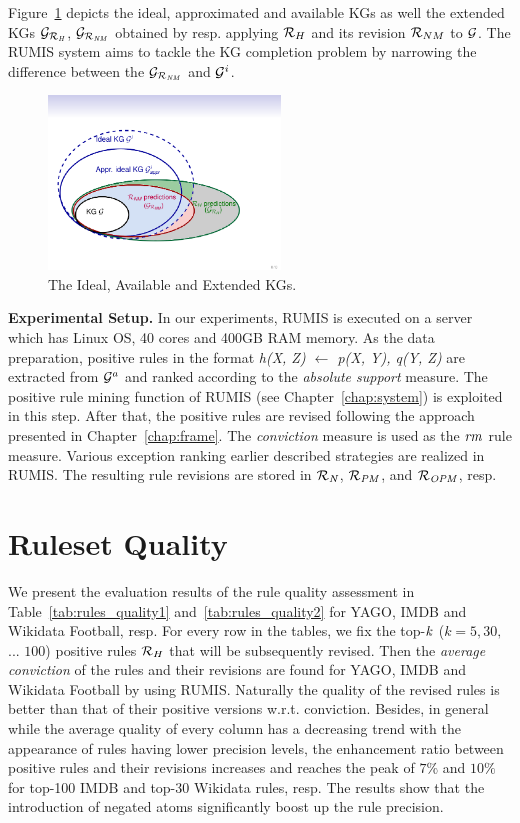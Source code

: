 Figure~\ref{fig:venn} depicts the ideal, approximated and available KGs as well the extended KGs $\mathcal{G}_{\mathcal{R}_{\mathit{H}}}$, $\mathcal{G}_{\mathcal{R}_{\mathit{NM}}}$ obtained by resp. applying $\mathcal{R}_H$ and its revision $\mathcal{R}_{NM}$ to $\mathcal{G}$. The RUMIS system aims to tackle the KG completion problem by narrowing the difference between the $\mathcal{G}_{\mathcal{R}_{\mathit{NM}}}$ and $ \mathcal{G}^i$.

\begin{figure}[ht]
\centering
\includegraphics[width=0.55\textwidth]{figures/big_pic_exp}
\caption{The Ideal, Available and Extended KGs.}
\label{fig:venn}
\end{figure}

\textbf{Experimental Setup.} In our experiments, RUMIS is executed on a server which has Linux OS, 40 cores and 400GB RAM memory. As the data preparation, positive rules in the format \textit{h(X, Z) $\leftarrow$ p(X, Y), q(Y, Z)} are extracted from $\mathcal{G}^a$ and ranked according to the \textit{absolute support} measure. The positive rule mining function of RUMIS (see Chapter~\ref{chap:system}) is exploited in this step. After that, the positive rules are revised following the approach presented in Chapter~\ref{chap:frame}. The \textit{conviction} measure is used as the $\mathit{rm}$ rule measure. Various exception ranking earlier described strategies are realized in RUMIS. The resulting rule revisions are stored in $\mathit{\mathcal{R}_{N}}$, $\mathit{\mathcal{R}_{PM}}$, and $\mathit{\mathcal{R}_{OPM}}$, resp.

\section{Ruleset Quality}

We present the evaluation results of the rule quality assessment in Table~\ref{tab:rules_quality1} and~\ref{tab:rules_quality2} for YAGO, IMDB and Wikidata Football, resp. For every row in the tables, we fix the top-$\mathit{k}$ ($k=5,30,$ ... $100$) positive rules $\mathcal{R}_{H}$ that will be subsequently revised. Then the \textit{average conviction} of the rules and their revisions are found for YAGO, IMDB and Wikidata Football by using RUMIS. Naturally the quality of the revised rules is better than that of their positive versions w.r.t. conviction. Besides, in general while the average quality of every column has a decreasing trend with the appearance of rules having lower precision levels, the enhancement ratio between positive rules and their revisions increases and reaches the peak of $7\%$ and $10\%$ for top-100 IMDB and top-30 Wikidata rules, resp. The results show that the introduction of negated atoms significantly boost up the rule precision.

